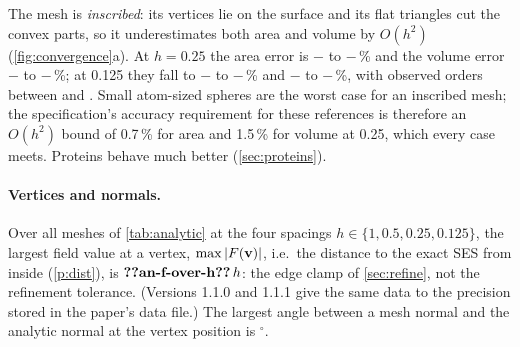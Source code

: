 The mesh is \emph{inscribed}: its vertices lie on the surface and its flat
triangles cut the convex parts, so it underestimates both area and volume
by $O(h^2)$ (\cref{fig:convergence}a). At $h = 0.25$\Ang{} the area error is
$-$ to $-$\,\% and the volume
error $-$ to $-$\,\%; at
0.125\Ang{} they fall to $-$ to
$-$\,\% and $-$ to
$-$\,\%, with observed orders between
 and . Small atom-sized spheres are the
worst case for an inscribed mesh; the specification's accuracy requirement
for these references is therefore an $O(h^2)$ bound of 0.7\,\% for area and
1.5\,\% for volume at 0.25\Ang, which every case meets. Proteins behave
much better (\cref{sec:proteins}).

\paragraph{Vertices and normals.}
Over all meshes of \cref{tab:analytic} at the four spacings
$h \in \{1, 0.5, 0.25, 0.125\}$\Ang, the largest field value at a vertex,
$\max|F(\mathbf{v})|$, i.e.\ the distance to the exact SES from inside
(\ref{p:dist}), is $\val{an-f-over-h}\,h$: the edge clamp of
\cref{sec:refine}, not the refinement tolerance. (Versions 1.1.0 and 1.1.1 give
the same data to the precision stored in the paper's data file.) The largest angle between
a mesh normal and the analytic normal at the vertex position is
$^\circ$.

